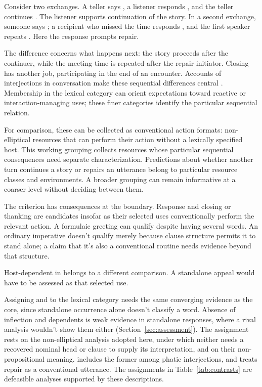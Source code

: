 \documentclass[12pt]{article}
\begin{document}
Consider two exchanges. A teller says , a listener responds , and the teller continues
. The listener supports continuation of the
story. In a second exchange, someone says ;
a recipient who missed the time responds , and the first
speaker repeats . Here the response prompts repair.

The difference concerns what happens next: the story proceeds after
the continuer, while the meeting time is repeated after the repair
initiator. Closing  has another job, participating in the
end of an encounter. Accounts of interjections in conversation make
these sequential differences central \citep[257--259, 263--265]{dingemanse2024}.
Membership in the lexical category can orient expectations toward reactive
or interaction-managing uses; these finer categories identify the particular
sequential relation.

For comparison, these can be collected as conventional action formats:
non-elliptical resources that can perform their action without a lexically
specified host. This working grouping collects resources whose particular sequential
consequences need separate characterization. Predictions about whether
another turn continues a story or repairs an utterance belong to
particular resource classes and environments. A broader grouping can
remain informative at a coarser level without deciding between them.

The criterion has consequences at the boundary. Response 
and closing or thanking  are candidates insofar as their
selected uses conventionally perform the relevant action. A formulaic
greeting  can qualify despite having several words.
An ordinary imperative  doesn't qualify merely because
clause structure permits it to stand alone; a claim that it's also a
conventional routine needs evidence beyond that structure.

Host-dependent  in  belongs to
a different comparison. A standalone appeal  would have
to be assessed as that selected use.

Assigning  and  to the lexical category
needs the same converging evidence as the core, since standalone occurrence
alone doesn't classify a word. Absence of inflection and dependents is weak
evidence in standalone responses, where a rival analysis wouldn't show them
either (Section~\ref{sec:assessment}). The assignment rests on the
non-elliptical analysis adopted here, under which neither needs a recovered
nominal head or clause to supply its interpretation, and on their
non-propositional meaning. \textcite[114]{ameka1992}
includes the former among phatic interjections, and
\textcite[152]{wilkins1992} treats repair  as a conventional
utterance. The assignments in Table~\ref{tab:contrasts} are defeasible
analyses supported by these descriptions.
\end{document}

